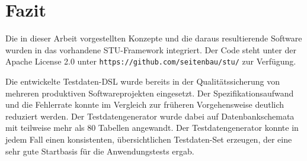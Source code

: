 \section{Fazit}

Die in dieser Arbeit vorgestellten Konzepte und die daraus resultierende Software wurden in das vorhandene STU-Framework integriert.
%
Der  Code steht  unter der Apache License 2.0 unter \texttt{https://github.com/seitenbau/stu/}  zur Verfügung. 
%

Die entwickelte Testdaten-DSL wurde bereits in der Qualitätssicherung von mehreren produktiven Softwareprojekten  eingesetzt.
%
Der Spezifikationsaufwand und die Fehlerrate konnte  im Vergleich zur  früheren Vorgehensweise  deutlich reduziert werden.
%
Der Testdatengenerator wurde dabei  auf  Datenbankschemata mit teilweise mehr als 80 Tabellen angewandt.
%
Der  Testdatengenerator konnte in jedem Fall  einen konsistenten, übersichtlichen Testdaten-Set erzeugen, der eine sehr gute Startbasis für die Anwendungstests ergab.

%

